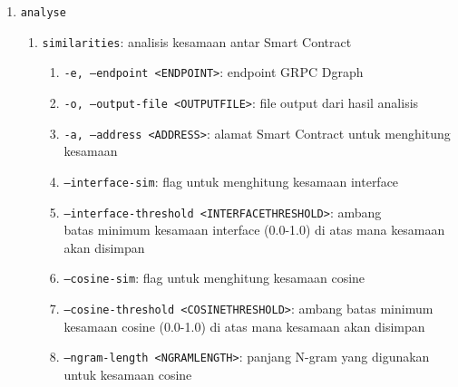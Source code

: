 \begin{enumerate}
\begin{enumerate}
		      \item \texttt{-d, --dgraph <DGRAPH>}: endpoint GRPC Dgraph
		      \item \texttt{--include-tx}: flag untuk menyertakan transaksi dalam \textit{streaming}
		      \item \texttt{--include-tokens}: flag untuk menyertakan transfer token dalam \textit{streaming}
		      \item \texttt{--include-logs}: flag untuk menyertakan log dalam \textit{streaming}
		      \item \texttt{--decompiler-timeout <DECOMPILER\textunderscore TIMEOUT>}: waktu maksimal untuk dekompilasi Smart Contract, dalam milliseconds
		      \item \texttt{--no-sync}: flag untuk melewati sinkronisasi dari blok terakhir yang diindeks di Dgraph, hanya mengambil blok live
		      \item \texttt{-n, --num-jobs <NUM\textunderscore JOBS>}: jumlah Tokio \textit{tasks} yang akan dijalankan secara paralel
	      \end{enumerate}
	\item \texttt{analyse}
	      \begin{enumerate}
		      \item \texttt{similarities}: analisis kesamaan antar Smart Contract
		            \begin{enumerate}
			            \item \texttt{-e, --endpoint <ENDPOINT>}: endpoint GRPC Dgraph
			            \item \texttt{-o, --output-file <OUTPUT\textunderscore FILE>}: file output dari hasil analisis
			            \item \texttt{-a, --address <ADDRESS>}: alamat Smart Contract untuk menghitung kesamaan
			            \item \texttt{--interface-sim}: flag untuk menghitung kesamaan interface
			            \item \texttt{--interface-threshold <INTERFACE\textunderscore THRESHOLD>}: ambang \\batas minimum kesamaan interface (0.0-1.0) di atas mana kesamaan akan disimpan
			            \item \texttt{--cosine-sim}: flag untuk menghitung kesamaan cosine
			            \item \texttt{--cosine-threshold <COSINE\textunderscore THRESHOLD>}: ambang batas minimum kesamaan cosine (0.0-1.0) di atas mana kesamaan akan disimpan
			            \item \texttt{--ngram-length <NGRAM\textunderscore LENGTH>}: panjang N-gram yang digunakan untuk kesamaan cosine

\end{enumerate}
\end{enumerate}
\end{enumerate}
